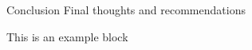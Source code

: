 \begin{frame}{Conclusion}
Final thoughts and recommendations
    \begin{exampleblock}{This is an example block}
        \lipsum[5][1-3]
    \end{exampleblock}
\end{frame}